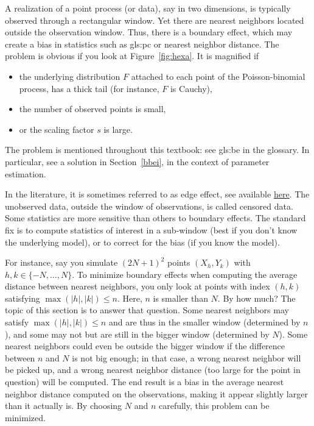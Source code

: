 \documentclass[10pt]{article}
\begin{document}
A realization of a point process (or data), say in two dimensions, is typically observed through a rectangular window. Yet there are nearest neighbors located outside the observation window. Thus, there is a boundary effect, which may create a \textcolor{index}{bias} in statistics such as 
\gls{gls:pc} or \textcolor{index}{nearest neighbor distance}. The problem is obvious if you look at Figure~\ref{fig:hexa}. It is magnified if 
\begin{itemize}
\item the underlying distribution $F$ attached to each point of the Poisson-binomial process, has a thick tail (for instance, $F$ is Cauchy),
\item the number of observed points is small,
\item or the \textcolor{index}{scaling factor} $s$ is large.
\end{itemize}
The problem is mentioned throughout this textbook: see \gls{gls:be} in the glossary. 
In particular, see a solution in Section~\ref{bbei}, in the context of parameter estimation.

In the literature, it is sometimes referred to as 
\textcolor{index}{edge effect}, see \cite{badxxx} available \href{https://projecteuclid.org/journals/annals-of-statistics/volume-25/issue-1/Kaplan-Meier-estimators-of-distance-distributions-for-spatial-point-processes/10.1214/aos/1034276629.full}{here}. The unobserved data, outside the window of observations, is called 
\textcolor{index}{censored data}. Some statistics are more sensitive than others to boundary effects.  The standard fix is to compute statistics of interest in a sub-window (best if you don't know the underlying model), or to correct for the bias (if you know the model).

For instance, say you simulate $(2N+1)^2$ points $(X_h,Y_k)$ with $h,k\in\{-N,\dots,N\}$. To minimize boundary effects when computing the average distance between nearest neighbors, you only look at points with index $(h, k)$ satisfying $\max(|h|,|k|)\leq n$. Here, $n$ is smaller than $N$. By how much? The topic of this section is to answer that question. Some nearest neighbors may satisfy $\max(|h|,|k|)\leq n$ and are thus in the smaller window (determined by $n$), and some may not but are still in the bigger window (determined by $N$). Some nearest neighbors could even be outside the bigger window if the difference between $n$ and $N$ is not big enough; in that case, a wrong nearest neighbor will be picked up, and a wrong nearest neighbor distance (too large for the point in question) will be computed. The end result is a bias in the average nearest neighbor distance computed on the observations, making it appear slightly larger than it actually is. By choosing $N$ and $n$ carefully, this problem can be minimized.
\end{document}
